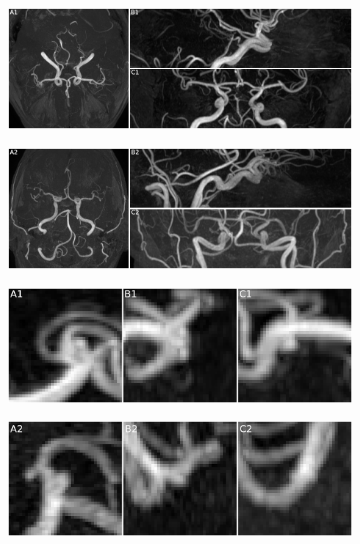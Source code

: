 \begin{figure}[h]
	\centering
	\begin{subfigure}{\linewidth}
		\includegraphics[width=\linewidth]{figures/mip_10021.png}
	\end{subfigure}
	\begin{subfigure}{\linewidth}
		\includegraphics[width=\linewidth]{figures/mip_10028.png}
	\end{subfigure}
	\caption[Maximum Intensity Projections of two positive cases.]{}
	\label{fig:mip}
\end{figure}

\begin{figure}[t]
	\centering
	\begin{subfigure}{\linewidth}
		\includegraphics[width=\linewidth]{figures/mip_patch10021.png}
	\end{subfigure}
	\begin{subfigure}{\linewidth}
		\includegraphics[width=\linewidth]{figures/mip_patch10028.png}
	\end{subfigure}
	\caption[Maximum Intensity Projections of two positive cases.]{}
	\label{fig:mip_patch}
\end{figure}


